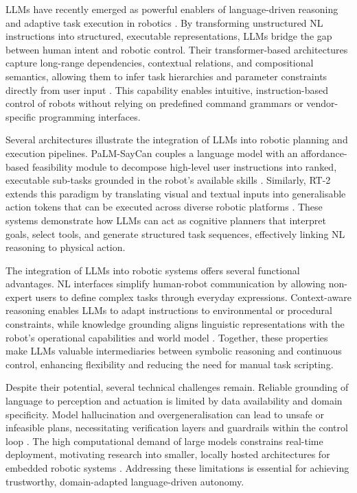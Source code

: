 
LLMs have recently emerged as powerful enablers of language-driven reasoning and adaptive task execution in robotics \cite{zeng2023large,wang2025large,yoshikawa2023large}. By transforming unstructured NL instructions into structured, executable representations, LLMs bridge the gap between human intent and robotic control. Their transformer-based architectures capture long-range dependencies, contextual relations, and compositional semantics, allowing them to infer task hierarchies and parameter constraints directly from user input \cite{zeng2023large,wang2025large}. This capability enables intuitive, instruction-based control of robots without relying on predefined command grammars or vendor-specific programming interfaces.

Several architectures illustrate the integration of LLMs into robotic planning and execution pipelines. PaLM-SayCan couples a language model with an affordance-based feasibility module to decompose high-level user instructions into ranked, executable sub-tasks grounded in the robot’s available skills \cite{zeng2023large}. Similarly, RT-2 extends this paradigm by translating visual and textual inputs into generalisable action tokens that can be executed across diverse robotic platforms \cite{wang2025large}. These systems demonstrate how LLMs can act as cognitive planners that interpret goals, select tools, and generate structured task sequences, effectively linking NL reasoning to physical action.

The integration of LLMs into robotic systems offers several functional advantages. NL interfaces simplify human-robot communication by allowing non-expert users to define complex tasks through everyday expressions. Context-aware reasoning enables LLMs to adapt instructions to environmental or procedural constraints, while knowledge grounding aligns linguistic representations with the robot’s operational capabilities and world model \cite{zeng2023large,yoshikawa2023large}. Together, these properties make LLMs valuable intermediaries between symbolic reasoning and continuous control, enhancing flexibility and reducing the need for manual task scripting.

Despite their potential, several technical challenges remain. Reliable grounding of language to perception and actuation is limited by data availability and domain specificity. Model hallucination and overgeneralisation can lead to unsafe or infeasible plans, necessitating verification layers and guardrails within the control loop \cite{yoshikawa2023large}. The high computational demand of large models constrains real-time deployment, motivating research into smaller, locally hosted architectures for embedded robotic systems \cite{wang2025large}. Addressing these limitations is essential for achieving trustworthy, domain-adapted language-driven autonomy.

